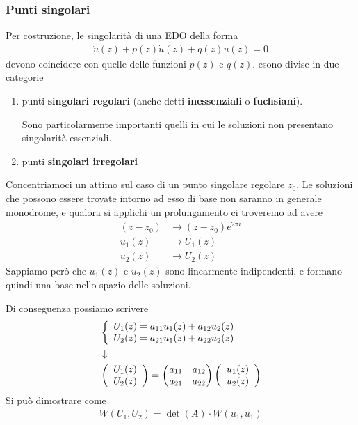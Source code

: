 \subsubsection{Punti singolari}

Per costruzione, le singolarità di una EDO della forma
\begin{align}
	\ddot{u}(z) + p(z) \dot{u}(z) + q(z)u(z) = 0
\end{align}
devono coincidere con quelle delle funzioni $p(z)$ e $q(z)$, esono divise in due categorie
\begin{enumerate}
	\item punti \textbf{singolari regolari} (anche detti \textbf{inessenziali} o \textbf{fuchsiani}).
	
	Sono particolarmente importanti quelli in cui le soluzioni non presentano singolarità essenziali.
	\item punti \textbf{singolari irregolari}
\end{enumerate}
Concentriamoci un attimo sul caso di un punto singolare regolare $z_0$. Le soluzioni che possono essere trovate intorno ad esso di base non saranno in generale monodrome, e qualora si applichi un prolungamento ci troveremo ad avere
\begin{align}
	(z-z_0) &\to (z-z_0)e^{2\pi i}\\
	u_1(z)  &\to U_1(z)\\
	u_2(z)  &\to U_2(z)
\end{align}
\newpage
Sappiamo però che $u_1(z)$ e $u_2(z)$ sono linearmente indipendenti, e formano quindi una base nello spazio delle soluzioni.

Di conseguenza possiamo scrivere
\begin{align}
	&\left\{ \begin{array}{cc} U_1(z) = a_{11} u_1(z) + a_{12} u_2(z)\\ U_2(z) = a_{21} u_1(z) + a_{22} u_2(z) \end{array} \right.\\ &\downarrow \nonumber \\
	&\left(
	 \begin{array}{c}
		 U_1(z)\\
		 U_2(z)
	 \end{array}\right) = 
	 \begin{pmatrix}
		 a_{11} & a_{12}\\
		 a_{21} & a_{22}
	 \end{pmatrix} 	\left(
     \begin{array}{c}
		 u_1(z)\\
		 u_2(z)
	\end{array}\right)
\end{align}
Si può dimostrare come
\begin{align}
	W(U_1,U_2) = \det(A) \cdot W(u_1, u_1)
\end{align}


